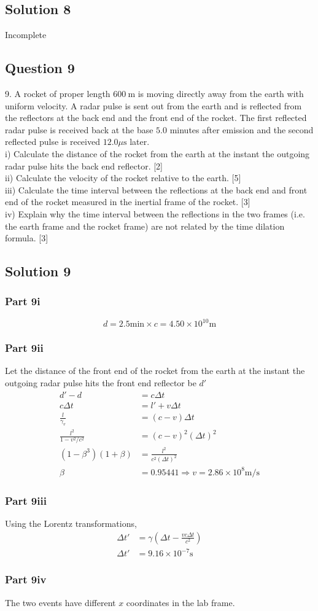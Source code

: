 \documentclass{article}
\begin{document}
\subsection{Solution 8}
Incomplete
\subsection{Question 9}
9. A rocket of proper length $600 \mathrm{~m}$ is moving directly away from the earth with uniform velocity. A radar pulse is sent out from the earth and is reflected from the reflectors at the back end and the front end of the rocket. The first reflected radar pulse is received back at the base $5.0$ minutes after emission and the second reflected pulse is received $12.0 \mu \mathrm{s}$ later. \\
i) Calculate the distance of the rocket from the earth at the instant the outgoing radar pulse hits the back end reflector. [2] \\
ii) Calculate the velocity of the rocket relative to the earth. [5] \\
iii) Calculate the time interval between the reflections at the back end and front end of the rocket measured in the inertial frame of the rocket. [3] \\
iv) Explain why the time interval between the reflections in the two frames (i.e. the earth frame and the rocket frame) are not related by the time dilation formula. [3]

\subsection{Solution 9}
\subsubsection{Part 9i}
$$
d=2.5\mathrm{min} \times c = 4.50\times 10^10 \mathrm{m}
$$
\subsubsection{Part 9ii}
Let the distance of the front end of the rocket from the earth at the instant the outgoing radar pulse hits the front end reflector be $d'$
\begin{align}
    d' - d &= c \Delta t \\
    c\Delta t &= l' + v\Delta t \\
    \frac{l}{\gamma_v} &= (c-v)\Delta t \\
    \frac{l^2}{1-v^2/c^2} &= (c-v)^2(\Delta t)^2 \\
    (1-\beta^3)(1+\beta) &= \frac{l^2}{c^2 (\Delta t)^2} \\
    \beta &= 0.95441 \Rightarrow v = 2.86 \times 10^8 \mathrm{m/s}
\end{align}

\subsubsection{Part 9iii}
Using the Lorentz transformations,
\begin{align}
    \Delta t' &= \gamma \left(\Delta t - \frac{vc\Delta t}{c^2} \right) \\
    \Delta t' &= 9.16 \times 10^{-7} \mathrm{s}
\end{align}

\subsubsection{Part 9iv}
The two events have different $x$ coordinates in the lab frame.
\end{document}
